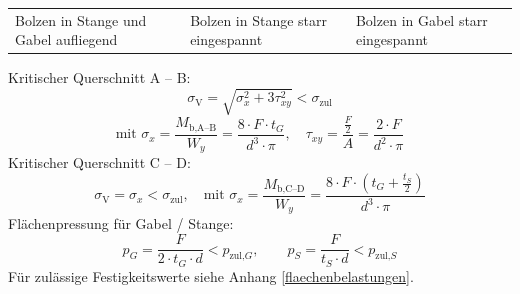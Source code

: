 		\begin{tabular}{p{}p{}p{}@{}}
		Bolzen in Stange und Gabel aufliegend & Bolzen in Stange starr eingespannt & Bolzen in Gabel starr eingespannt
		\end{tabular}
		
		Kritischer Querschnitt A -- B:
		\begin{equation*}
			\sigma_{\text{V}} = \sqrt{\sigma_x^2 + 3 \tau_{xy}^2} < \sigma_{\text{zul}}
		\end{equation*}
		\begin{equation*}
			\text{mit } \sigma_x = \frac{M_{\text{b,A--B}}}{W_y}= \frac{8 \cdot F \cdot t_G}{d^3 \cdot \pi}, \quad \tau_{xy}= \frac{\frac{F}{2}}{A}= \frac{2 \cdot F}{d^2 \cdot \pi}
		\end{equation*}
		Kritischer Querschnitt C -- D:
		\begin{equation*}
			\sigma_{\text{V}} = \sigma_x < \sigma_{\text{zul}}, \quad \text{mit } \sigma_x = \frac{M_{\text{b,C--D}}}{W_y}=\frac{8 \cdot F \cdot \left(t_G + \frac{t_S}{2}\right)}{d^3 \cdot \pi}
		\end{equation*}
		Flächenpressung für Gabel / Stange:
		\begin{equation*}
			p_G = \frac{F}{2 \cdot t_G \cdot d} < p_{\text{zul,}G}, \qquad p_S = \frac{F}{t_S \cdot d} < p_{\text{zul,}S}
		\end{equation*}
		Für zulässige Festigkeitswerte siehe Anhang \ref{flaechenbelastungen}.

